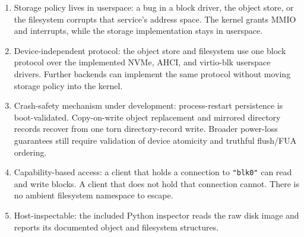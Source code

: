 \begin{enumerate}
    \item Storage policy lives in userspace: a bug in a block
        driver, the object store, or the filesystem corrupts that service's
        address space. The kernel grants MMIO and interrupts, while the storage
        implementation stays in userspace.

    \item Device-independent protocol: the object store and filesystem use
        one block protocol over the implemented NVMe, AHCI, and virtio-blk
        userspace drivers. Further backends can implement the same protocol
        without moving storage policy into the kernel.

    \item Crash-safety mechanism under development: process-restart
        persistence is boot-validated. Copy-on-write object replacement and
        mirrored directory records recover from one torn directory-record
        write. Broader power-loss guarantees still require validation of
        device atomicity and truthful flush/FUA ordering.

    \item Capability-based access: a client that holds a connection to
        \texttt{"blk0"} can read and write blocks. A client that does not hold
        that connection cannot. There is no ambient filesystem namespace to
        escape.

    \item Host-inspectable: the included Python inspector reads the raw
        disk image and reports its documented object and filesystem structures.
\end{enumerate}

\endinput
